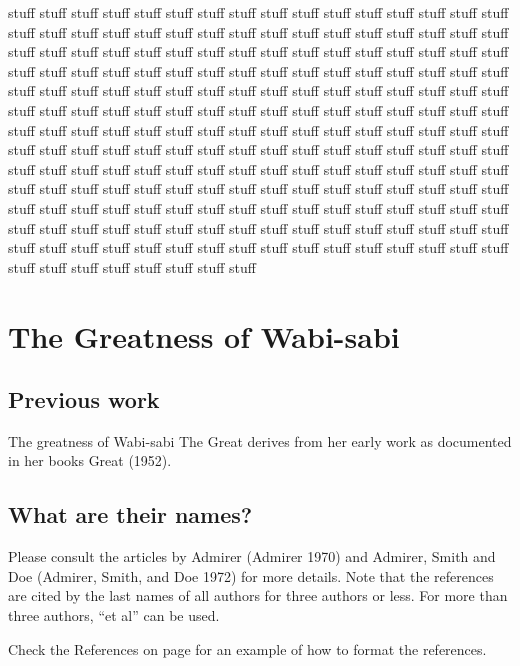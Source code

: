 \documentclass[
  dissertation]{bsu-cs}
\begin{document}
stuff stuff stuff stuff stuff stuff stuff stuff stuff stuff stuff stuff
stuff stuff stuff stuff stuff stuff stuff stuff stuff stuff stuff stuff
stuff stuff stuff stuff stuff stuff stuff stuff stuff stuff stuff stuff
stuff stuff stuff stuff stuff stuff stuff stuff stuff stuff stuff stuff
stuff stuff stuff stuff stuff stuff stuff stuff stuff stuff stuff stuff
stuff stuff stuff stuff stuff stuff stuff stuff stuff stuff stuff stuff
stuff stuff stuff stuff stuff stuff stuff stuff stuff stuff stuff stuff
stuff stuff stuff stuff stuff stuff stuff stuff stuff stuff stuff stuff
stuff stuff stuff stuff stuff stuff stuff stuff stuff stuff stuff stuff
stuff stuff stuff stuff stuff stuff stuff stuff stuff stuff stuff stuff
stuff stuff stuff stuff stuff stuff stuff stuff stuff stuff stuff stuff
stuff stuff stuff stuff stuff stuff stuff stuff stuff stuff stuff stuff
stuff stuff stuff stuff stuff stuff stuff stuff stuff stuff stuff stuff
stuff stuff stuff stuff stuff stuff stuff stuff stuff stuff stuff stuff
stuff stuff stuff stuff stuff stuff stuff stuff stuff stuff stuff stuff
stuff stuff stuff stuff stuff stuff stuff stuff stuff stuff stuff stuff
stuff stuff stuff stuff stuff stuff stuff stuff stuff stuff stuff stuff
stuff stuff stuff stuff stuff stuff stuff stuff stuff stuff stuff stuff

\section{The Greatness of Wabi-sabi}\label{sec-wabisabiGreatness}

\subsection{Previous work}\label{previous-work}

The greatness of Wabi-sabi The Great derives from her early work as
documented in her books Great (1952).

\subsection{What are their names?}\label{what-are-their-names}

Please consult the articles by Admirer (Admirer 1970) and Admirer, Smith
and Doe (Admirer, Smith, and Doe 1972) for more details. Note that the
references are cited by the last names of all authors for three authors
or less. For more than three authors, ``et al'' can be used.

Check the References on page \pageref{refs} for an example of how to
format the references.
\end{document}
